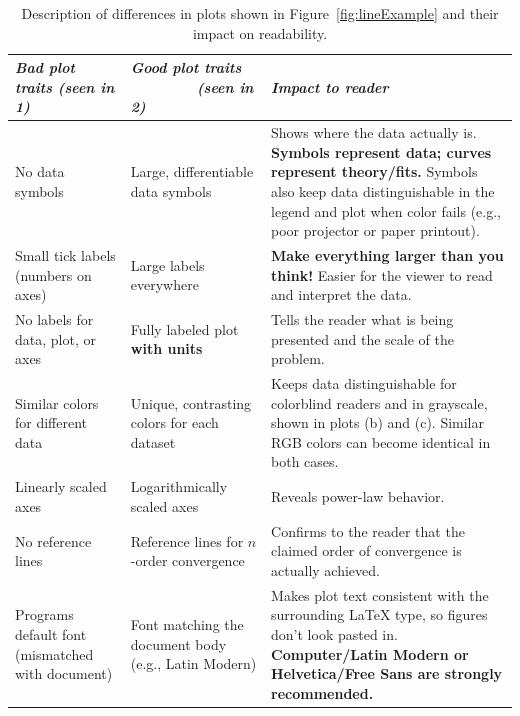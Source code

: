\begin{table}[h!]
    \centering
    \begin{tabular}{|>{\raggedright\arraybackslash}p{3cm}|>{\raggedright\arraybackslash}p{4cm}||>{\raggedright\arraybackslash}p{6cm}|}
        \hline
        \textit{Bad plot traits (seen in 1)} & \textit{Good plot traits \ \ \ \ \ \ \ \  (seen in 2)} & \textit{Impact to reader} \\
        \hline
        No data symbols & Large, differentiable data symbols & Shows where the data actually is. \textbf{Symbols represent data; curves represent theory/fits.} {\small Symbols also keep data distinguishable in the legend and plot when color fails (e.g., poor projector or paper printout).} \\
        Small tick labels (numbers on axes) & Large labels everywhere & \textbf{Make everything larger than you think!} Easier for the viewer to read and interpret the data. \\
        No labels for data, plot, or axes & Fully labeled plot \textbf{with units} & Tells the reader what is being presented and the scale of the problem. \\
        Similar colors for different data & Unique, contrasting colors for each dataset & Keeps data distinguishable for colorblind readers and in grayscale, shown in plots (b) and (c). Similar RGB colors can become identical in both cases. \\
        Linearly scaled axes & Logarithmically scaled axes & Reveals power-law behavior. \\
        No reference lines & Reference lines for $n$-order convergence & Confirms to the reader that the claimed order of convergence is actually achieved. \\
        Programs default font (mismatched with document) & Font matching the document body (e.g., Latin Modern) & Makes plot text consistent with the surrounding \LaTeX{} type, so figures don't look pasted in. \textbf{Computer/Latin Modern or Helvetica/Free Sans are strongly recommended.} \\
        \hline
    \end{tabular}
    \caption{Description of differences in plots shown in Figure~\ref{fig:lineExample} and their impact on readability.}
    \label{tab:lineComparison}
\end{table}

\clearpage
\newpage


